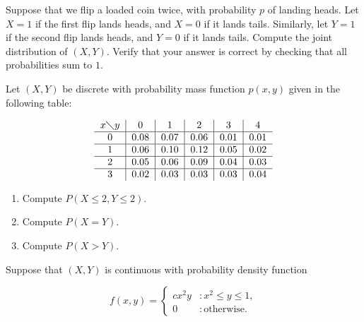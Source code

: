 \documentclass[12pt,reqno]{amsart}
\begin{document}
\bigskip

\prob Suppose that we flip a loaded coin twice, with probability $p$ of landing heads. Let $X=1$ if the first flip lands heads, and $X=0$ if it lands tails. Similarly, let $Y=1$ if the second flip lands heads, and $Y=0$ if it lands tails. Compute the joint distribution of $(X,Y)$. Verify that your answer is correct by checking that all probabilities sum to $1$.\vfill














    \bigskip
\prob Let $(X,Y)$ be discrete with probability mass function $p(x,y)$ given in the following table:


\[\begin{tabular}{c|c|c|c|c|c}
$x \diagdown y$ & 0 & 1 & 2 & 3 & 4  \\ \hline
0 & 0.08 & 0.07 & 0.06 & 0.01 & 0.01 \\ \hline
1 & 0.06 & 0.10 & 0.12 & 0.05 & 0.02 \\ \hline
2 & 0.05 & 0.06 & 0.09 & 0.04 & 0.03 \\ \hline
3 & 0.02 & 0.03 & 0.03 & 0.03 & 0.04 
\end{tabular}\]

\medskip
\begin{enumerate}
    \item Compute $P(X\leq 2, Y\leq 2)$.\vfill
    
    

    \item Compute $P(X=Y)$.\vfill
    
    

    \item Compute $P(X>Y)$.\vfill
    

\end{enumerate}
















\newpage
\prob Suppose that $(X,Y)$ is continuous with probability density function

    \[f(x,y) = \begin{cases}
        cx^2 y & : x^2 \leq y \leq 1, \\
        0 & : \text{otherwise}.
    \end{cases}\]
\end{document}

